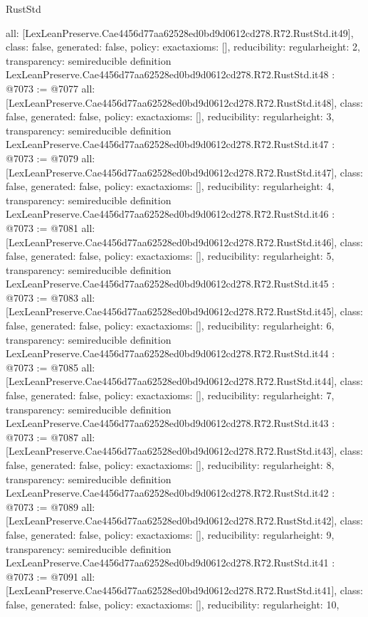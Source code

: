 \begin{lexlean}{RustStd}
\begin{coremodule}
{  all: [LexLeanPreserve.Cae4456d77aa62528ed0bd9d0612cd278.R72.RustStd.it49],
  class: false,
  generated: false,
  policy: exact{axioms: []},
  reducibility: regular{height: 2},
  transparency: semireducible
}
definition LexLeanPreserve.Cae4456d77aa62528ed0bd9d0612cd278.R72.RustStd.it48 : @7073 := @7077 {
  all: [LexLeanPreserve.Cae4456d77aa62528ed0bd9d0612cd278.R72.RustStd.it48],
  class: false,
  generated: false,
  policy: exact{axioms: []},
  reducibility: regular{height: 3},
  transparency: semireducible
}
definition LexLeanPreserve.Cae4456d77aa62528ed0bd9d0612cd278.R72.RustStd.it47 : @7073 := @7079 {
  all: [LexLeanPreserve.Cae4456d77aa62528ed0bd9d0612cd278.R72.RustStd.it47],
  class: false,
  generated: false,
  policy: exact{axioms: []},
  reducibility: regular{height: 4},
  transparency: semireducible
}
definition LexLeanPreserve.Cae4456d77aa62528ed0bd9d0612cd278.R72.RustStd.it46 : @7073 := @7081 {
  all: [LexLeanPreserve.Cae4456d77aa62528ed0bd9d0612cd278.R72.RustStd.it46],
  class: false,
  generated: false,
  policy: exact{axioms: []},
  reducibility: regular{height: 5},
  transparency: semireducible
}
definition LexLeanPreserve.Cae4456d77aa62528ed0bd9d0612cd278.R72.RustStd.it45 : @7073 := @7083 {
  all: [LexLeanPreserve.Cae4456d77aa62528ed0bd9d0612cd278.R72.RustStd.it45],
  class: false,
  generated: false,
  policy: exact{axioms: []},
  reducibility: regular{height: 6},
  transparency: semireducible
}
definition LexLeanPreserve.Cae4456d77aa62528ed0bd9d0612cd278.R72.RustStd.it44 : @7073 := @7085 {
  all: [LexLeanPreserve.Cae4456d77aa62528ed0bd9d0612cd278.R72.RustStd.it44],
  class: false,
  generated: false,
  policy: exact{axioms: []},
  reducibility: regular{height: 7},
  transparency: semireducible
}
definition LexLeanPreserve.Cae4456d77aa62528ed0bd9d0612cd278.R72.RustStd.it43 : @7073 := @7087 {
  all: [LexLeanPreserve.Cae4456d77aa62528ed0bd9d0612cd278.R72.RustStd.it43],
  class: false,
  generated: false,
  policy: exact{axioms: []},
  reducibility: regular{height: 8},
  transparency: semireducible
}
definition LexLeanPreserve.Cae4456d77aa62528ed0bd9d0612cd278.R72.RustStd.it42 : @7073 := @7089 {
  all: [LexLeanPreserve.Cae4456d77aa62528ed0bd9d0612cd278.R72.RustStd.it42],
  class: false,
  generated: false,
  policy: exact{axioms: []},
  reducibility: regular{height: 9},
  transparency: semireducible
}
definition LexLeanPreserve.Cae4456d77aa62528ed0bd9d0612cd278.R72.RustStd.it41 : @7073 := @7091 {
  all: [LexLeanPreserve.Cae4456d77aa62528ed0bd9d0612cd278.R72.RustStd.it41],
  class: false,
  generated: false,
  policy: exact{axioms: []},
  reducibility: regular{height: 10},
}
\end{coremodule}
\end{lexlean}
